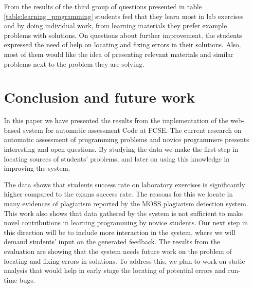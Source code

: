 \documentclass{llncs}
\begin{document}
From the results of the third group of questions presented in table
\ref{table:learning_programming} students feel that they learn most in lab
exercises and by doing individual work, from learning materials they prefer
example problems with solutions. On questions about further improvement,
the students expressed the need of help on locating and fixing errors in their
solutions. Also, most of them would like the idea of presenting relevant
materials and similar problems next to the problem they are solving.


\section{Conclusion and future work}

In this paper we have presented the results from the implementation of
the web-based system for automatic assessment Code at FCSE. The current research
on automatic assessment of programming problems and novice programmers presents
interesting and open questions. By studying the data we make the first step in
locating sources of students' problems, and later on using this knowledge in
improving the system.

The data shows that students success rate on laboratory exercises is
significantly higher compared to the exams success rate. The reasons for this we
locate in many evidences of plagiarism reported by the MOSS plagiarism detection
system. This work also shows that data gathered by the system is not sufficient
to make novel contributions in learning programming by novice students. Our next
step in this direction will be to include more interaction in the system, where
we will demand students' input on the generated feedback. The results from the
evaluation are showing that the system needs future work on the problem of
locating and fixing errors in solutions. To address this, we plan to work on
static analysis that would help in early stage the locating of potential errors
and run-time bugs.




\end{document}
